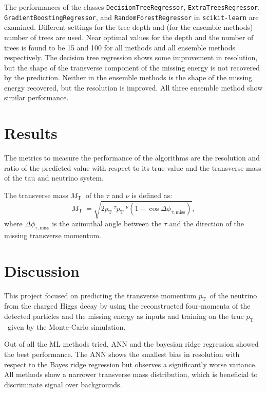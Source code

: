 \documentclass{scrartcl}
\newcommand{\pt}{\ensuremath{p_\text{T}}~}
\newcommand{\mt}{\ensuremath{M_\text{T}}~}
\begin{document}
The performances of the classes \texttt{DecisionTreeRegressor}, \texttt{ExtraTreesRegressor}, \texttt{GradientBoostingRegressor}, and \texttt{RandomForestRegressor} in \texttt{scikit-learn} are examined. Different settings for the tree depth and (for the ensemble methods) number of trees are used. Near optimal values for the depth and the number of trees is found to be 15 and 100 for all methods and all ensemble methods respectively. The decision tree regression shows some improvement in resolution, but the shape of the transverse component of the missing energy is not recovered by the prediction. Neither in the ensemble methods is the shape of the missing energy recovered, but the resolution is improved. All three ensemble method show similar performance.

\section{Results}
\label{sec:results}

The metrics to measure the performance of the algorithms are the resolution and ratio of the predicted value with respect to its true value and the transverse mass of the tau and neutrino system.

The transverse mass $\mt$ of the $\tau$ and $\nu$ 
is defined as:
\begin{equation}
  \label{eq:mt}
  \mt=\sqrt{ 2 \pt^\tau \pt^\nu   (1-\cos \Delta\phi_{\tau,\text{miss}}) },
\end{equation}
where $\Delta\phi_{\tau,\text{miss}}$ is the azimuthal angle between the $\tau$ 
and the direction of the missing transverse momentum. 


\section{Discussion}

This project focused on predicting the transverse momentum \pt of the neutrino from the charged Higgs decay by using the reconstructed four-momenta of the detected particles and the missing energy as inputs and training on the true \pt given by the Monte-Carlo simulation.

Out of all the \gls{ML} methods tried, \gls{ANN} and the bayesian ridge regression showed the best performance. The  \gls{ANN} shows the smallest bias in resolution with respect to the Bayes ridge regression but observes a significantly worse variance. All methods show a narrower transverse mass distribution, which is beneficial to discriminate signal over backgrounds.
\end{document}
